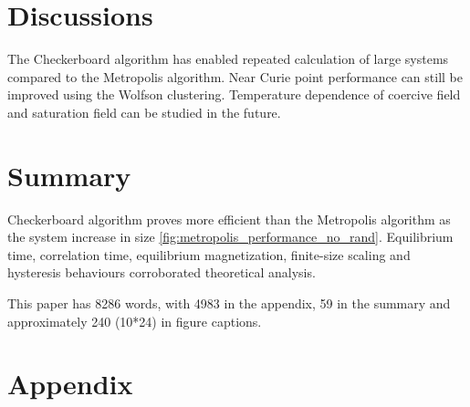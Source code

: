 \documentclass[%
showkeys,
bibnotes,
amsmath,amssymb,
floatfix,
]{revtex4-1}
\begin{document}
\section{\label{sec:level1}Discussions}
The Checkerboard algorithm has enabled repeated calculation of large systems compared to the Metropolis algorithm. Near Curie point performance can still be improved using the Wolfson clustering. Temperature dependence of coercive field and saturation field can be studied in the future.


\section{\label{sec:level1}Summary}
Checkerboard algorithm \cite{BLOCK20101549} proves more efficient than the Metropolis algorithm as the system increase in size \ref{fig:metropolis_performance_no_rand}. Equilibrium time, correlation time, equilibrium magnetization, finite-size scaling and hysteresis behaviours corroborated theoretical analysis. 

This paper has 8286 words, with 4983 in the appendix, 59 in the summary and approximately 240 (10*24) in figure captions.

\section{\label{sec:level1}Appendix}
\end{document}
